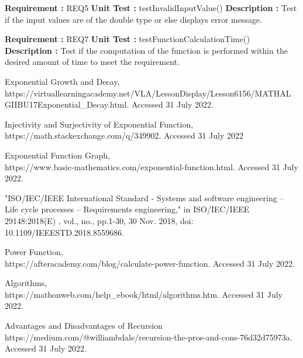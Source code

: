 \documentclass[12pt, a4paper]{article}
\begin{document}
\noindent
\textbf{Requirement : }  REQ5
    \newline
    \textbf{Unit Test : } testInvalidInputValue()
    \newline
    \textbf{Description : } Test if the input values are of the double type or else displays error message.
    \newline
    
\noindent
\textbf{Requirement : }  REQ7
    \newline
    \textbf{Unit Test : } testFunctionCalculationTime()
    \newline
    \textbf{Description : } Test if the computation of the function is performed within the desired amount of time to meet the requirement.
    
\newpage
    
\begin{thebibliography}{20}
Exponential Growth and Decay,\\
https://virtuallearningacademy.net/VLA/LessonDisplay/Lesson6156/MATHAL GIIBU17Exponential\_Decay.html. Accessed 31 July 2022.

Injectivity and Surjectivity of Exponential Function,\\
https://math.stackexchange.com/q/349902. Accessed 31 July 2022


Exponential Function Graph,\\
https://www.basic-mathematics.com/exponential-function.html. Accessed 31 July 2022.

"ISO/IEC/IEEE International Standard - Systems and software engineering -- Life cycle processes -- Requirements engineering," in ISO/IEC/IEEE 29148:2018(E) , vol., no., pp.1-30, 30 Nov. 2018, doi: 10.1109/IEEESTD.2018.8559686.

Power Function,\\
https://afteracademy.com/blog/calculate-power-function. Accessed 31 July 2022.

Algorithms,\\
https://mathonweb.com/help\_ebook/html/algorithms.htm. Accessed 31 July 2022.

Advantages and Disadvantages of Recursion\\
https://medium.com/@williambdale/recursion-the-pros-and-cons-76d32d75973a. Accessed 31 July 2022.
 

\end{thebibliography}
\end{document}
